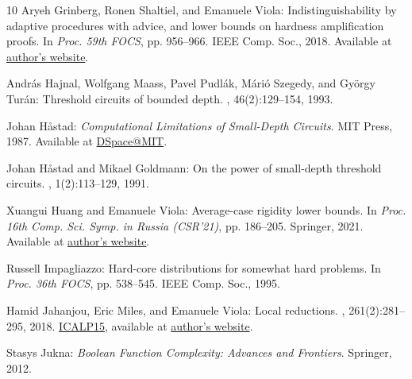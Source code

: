\documentclass[11pt]{article}
\begin{document}
\begin{thebibliography}{10}
{\sc Aryeh Grinberg, Ronen Shaltiel, and Emanuele Viola}: Indistinguishability
  by adaptive procedures with advice, and lower bounds on hardness
  amplification proofs.
\newblock In {\em Proc. 59th FOCS}, pp. 956--966. IEEE Comp. Soc., 2018.
\newblock Available at \href{https://www.ccs.neu.edu/home/viola/}{author's
  website}.

{\sc Andr{\'a}s Hajnal, Wolfgang Maass, Pavel Pudl{\'a}k, M{\'a}ri{\'o}
  Szegedy, and Gy{\"o}rgy Tur{\'a}n}: Threshold circuits of bounded depth.
, 46(2):129--154, 1993.
\newblock [\epfmtdoi{10.1016/0022-0000(93)90001-D}]

{\sc Johan H{\aa}stad}: {\em Computational Limitations of Small-Depth
  Circuits}.
\newblock MIT Press, 1987.
\newblock Available at \href{https://hdl.handle.net/1721.1/150504}{DSpace@MIT}.

{\sc Johan H{\aa}stad and Mikael Goldmann}: On the power of small-depth
  threshold circuits.
, 1(2):113--129, 1991.
\newblock [\epfmtdoi{10.1007/BF01272517}]

{\sc Xuangui Huang and Emanuele Viola}: Average-case rigidity lower bounds.
\newblock In {\em Proc. 16th Comp. Sci. Symp. in Russia (CSR'21)}, pp.
  186--205. Springer, 2021.
\newblock Available at \href{https://www.ccs.neu.edu/home/viola/}{author's
  website}.

{\sc Russell Impagliazzo}: Hard-core distributions for somewhat hard problems.
\newblock In {\em Proc. 36th FOCS}, pp. 538--545. IEEE Comp. Soc., 1995.

{\sc Hamid Jahanjou, Eric Miles, and Emanuele Viola}: Local reductions.
, 261(2):281--295, 2018.
\newblock \prelim
  \href{https://doi.org/10.1007/978-3-662-47672-7\_61}{ICALP15}, available at
  \href{https://www.ccs.neu.edu/home/viola/}{author's website}.
\newblock [\epfmtdoi{10.1016/j.ic.2018.02.009}]

{\sc Stasys Jukna}: {\em Boolean Function Complexity: Advances and Frontiers}.
\newblock Springer, 2012.
\newblock [\epfmtdoi{10.1007/978-3-642-24508-4}]


\end{thebibliography}
\end{document}

